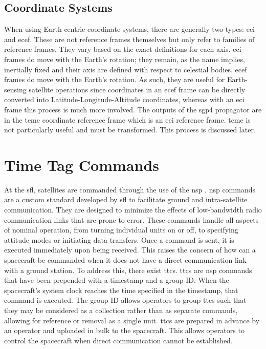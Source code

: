 \subsection{Coordinate Systems}

When using Earth-centric coordinate systems, there are generally two types:
\gls{eci} and \gls{ecef}. These are not reference frames themselves but only
refer to families of reference frames. They vary based on the exact definitions
for each axis.  \gls{eci} frames do move with the Earth's rotation; they
remain, as the name implies, inertially fixed and their axis are defined with
respect to celestial bodies. \gls{ecef} frames do move with the Earth's
rotation. As such, they are useful for Earth-sensing satellite operations since
coordinates in an \gls{ecef} frame can be directly converted into
Latitude-Longitude-Altitude coordinates, whereas with an \gls{eci} frame this
process is much more involved. The outputs of the \gls{sgp4} propagator are in
the \gls{teme} coordinate reference frame which is an \gls{eci} reference
frame. \gls{teme} is not particularly useful and must be transformed. This
process is discussed later.



\section{Time Tag Commands}

At the \gls{sfl}, satellites are commanded through the use of the \gls{nsp}
\cite{kekez_nanosatellite_2010}.  \gls{nsp} commands are a custom standard
developed by \gls{sfl} to facilitate ground and intra-satellite communication.
They are designed to minimize the effects of low-bandwidth radio communication
links that are prone to error.  These commands handle all aspects of nominal
operation, from turning individual units on or off, to specifying attitude
modes or initiating data transfers.  Once a command is sent, it is executed
immediately upon being received. This raises the concern of how can a
spacecraft be commanded when it does not have a direct communication link with
a ground station. To address this, there exist \glspl{ttc}.  \glspl{ttc} are
\gls{nsp} commands that have been prepended with a timestamp and a group ID.
When the spacecraft’s system clock reaches the time specified in the timestamp,
that command is executed.  The group ID allows operators to group \glspl{ttc}
such that they may be considered as a collection rather than as separate
commands, allowing for reference or removal as a single unit.  \glspl{ttc} are
prepared in advance by an operator and uploaded in bulk to the spacecraft.
This allows operators to control the spacecraft when direct communication
cannot be established.



